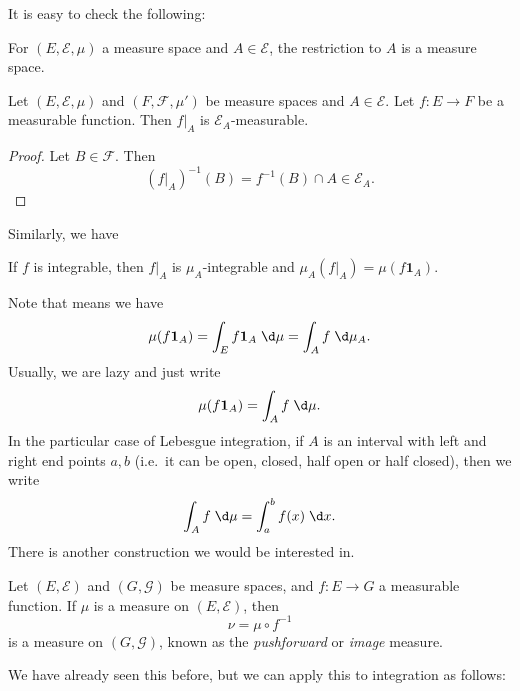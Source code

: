 \documentclass[a4paper]{article}
\begin{document}
It is easy to check the following:
\begin{lemma}
  For $(E, \mathcal{E}, \mu)$ a measure space and $A \in \mathcal{E}$, the restriction to $A$ is a measure space.
\end{lemma}

%
%
%
%

\begin{prop}
  Let $(E, \mathcal{E}, \mu)$ and $(F, \mathcal{F}, \mu')$ be measure spaces and $A \in \mathcal{E}$. Let $f: E \to F$ be a measurable function. Then $f|_A$ is $\mathcal{E}_A$-measurable.
\end{prop}

\begin{proof}
  Let $B \in \mathcal{F}$. Then
  \[
    (f|_A)^{-1}(B) = f^{-1}(B) \cap A \in \mathcal{E}_A.
  \]
\end{proof}

Similarly, we have
\begin{prop}
  If $f$ is integrable, then $f|_A$ is $\mu_A$-integrable and $\mu_A(f|_A) = \mu (f\mathbf{1}_A)$.
\end{prop}

Note that means we have
\[
  \mu(f\mathbf{1}_A) = \int_E f\mathbf{1}_A \;\d \mu = \int_A f \;\d \mu_A.
\]
Usually, we are lazy and just write
\[
  \mu(f\mathbf{1}_A) = \int_A f\;\d \mu.
\]
In the particular case of Lebesgue integration, if $A$ is an interval with left and right end points $a, b$ (i.e.\ it can be open, closed, half open or half closed), then we write
\[
  \int_A f\;\d \mu = \int_a^b f(x) \;\d x.
\]
There is another construction we would be interested in.
\begin{defi}
  Let $(E, \mathcal{E})$ and $(G, \mathcal{G})$ be measure spaces, and $f: E \to G$ a measurable function. If $\mu$ is a measure on $(E, \mathcal{E})$, then
  \[
    \nu = \mu \circ f^{-1}
  \]
  is a measure on $(G, \mathcal{G})$, known as the \emph{pushforward} or \emph{image} measure.
\end{defi}
We have already seen this before, but we can apply this to integration as follows:
\end{document}
